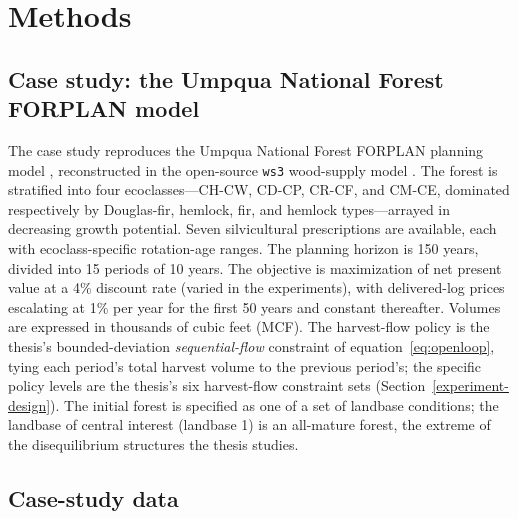\section{Methods}

\hypertarget{case-study-the-umpqua-national-forest-forplan-model}{%
\subsection{Case study: the Umpqua National Forest FORPLAN model}\label{case-study-the-umpqua-national-forest-forplan-model}}

The case study reproduces the Umpqua National Forest FORPLAN planning model \citep{usda1987umpqua}, reconstructed in the open-source \texttt{ws3} wood-supply model \citep{paradis2026ws3}. The forest is stratified into four ecoclasses---CH-CW, CD-CP, CR-CF, and CM-CE, dominated respectively by Douglas-fir, hemlock, fir, and hemlock types---arrayed in decreasing growth potential. Seven silvicultural prescriptions are available, each with ecoclass-specific rotation-age ranges. The planning horizon is 150 years, divided into 15 periods of 10 years. The objective is maximization of net present value at a 4\% discount rate (varied in the experiments), with delivered-log prices escalating at 1\% per year for the first 50 years and constant thereafter. Volumes are expressed in thousands of cubic feet (MCF). The harvest-flow policy is the thesis's bounded-deviation \emph{sequential-flow} constraint of equation~\eqref{eq:openloop}, tying each period's total harvest volume to the previous period's; the specific policy levels are the thesis's six harvest-flow constraint sets (Section~\ref{experiment-design}). The initial forest is specified as one of a set of landbase conditions; the landbase of central interest (landbase 1) is an all-mature forest, the extreme of the disequilibrium structures the thesis studies.

\hypertarget{case-study-data}{%
\subsection{Case-study data}\label{case-study-data}}

